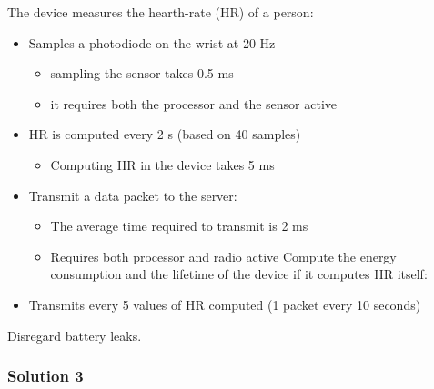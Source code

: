 \documentclass[10pt,a4paper]{report}
\theoremstyle{definition}
\begin{document}
The device measures the hearth-rate (HR) of a person:
\begin{itemize}
	\item 
	Samples a photodiode on the wrist at 20 Hz
	\begin{itemize}
		\item 
		sampling the sensor takes 0.5 ms
		\item 
		it requires both the processor and the sensor active
	\end{itemize}
	\item 
	HR is computed every 2 s (based on 40 samples)
	\begin{itemize}
		\item 
		Computing HR in the device takes 5 ms
	\end{itemize}
	\item 
	Transmit a data packet to the server:
	\begin{itemize}
		\item 
		The average time required to transmit is 2 ms
		\item 
		Requires both processor and radio active
		Compute the energy consumption and the lifetime of the device if it computes HR itself:
	\end{itemize}
	\item 
	Transmits every 5 values of HR computed (1 packet every 10 seconds)
	
\end{itemize}
Disregard battery leaks.
\subsubsection{Solution 3}\label{sec:solution-3}
\end{document}
